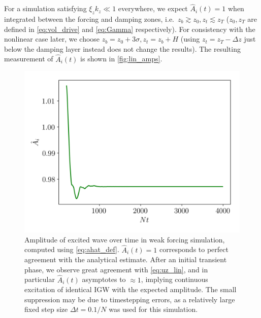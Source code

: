 \documentclass[
        fleqn,
        usenatbib,
    ]{mnras}
\begin{document}
For a simulation satisfying $\xi_z k_z \ll 1$ everywhere, we expect
$\hat{A}_i(t) = 1$ when integrated between the forcing and damping zones, i.e.\
$z_b \gtrsim z_0, z_t \lesssim z_T$ ($z_0, z_T$ are defined in
\autoref{eq:vol_drive} and \autoref{eq:Gamma} respectively). For consistency
with the nonlinear case later, we choose $z_b = z_0 + 3\sigma, z_t = z_b + H$
(using $z_t = z_T - \Delta z$ just below the damping layer instead does not
change the results). The resulting measurement of $\hat{A}_i(t)$ is shown in
\autoref{fig:lin_amps}.
\begin{figure}
    \centering
    \includegraphics[width=\columnwidth]{plots/lin_amps.png}
    \caption{Amplitude of excited wave over time in weak forcing simulation,
    computed using \autoref{eq:ahat_def}. $\hat{A}_i(t) = 1$ corresponds to
    perfect agreement with the analytical estimate. After an initial transient
    phase, we observe great agreement with \autoref{eq:uz_lin}, and in
    particular $\hat{A}_i(t)$ asymptotes to $\approx 1$, implying continuous
    excitation of identical IGW with the expected amplitude. The small
    suppression may be due to timestepping errors, as a relatively large fixed
    step size $\Delta t = 0.1/N$ was used for this
    simulation.}\label{fig:lin_amps}
\end{figure}
\end{document}
